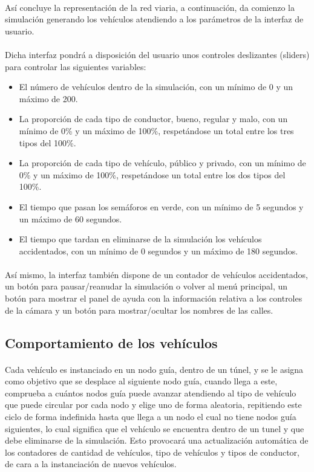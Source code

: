 	\paragraph{}
	Así concluye la representación de la red viaria, a continuación, da comienzo la simulación generando los vehículos atendiendo a los parámetros de la interfaz de usuario.
	
	\paragraph{}
	Dicha interfaz pondrá a disposición del usuario unos controles deslizantes (sliders) para controlar las siguientes variables:
	
	\begin{itemize}
	\item El número de vehículos dentro de la simulación, con un mínimo de 0 y un máximo de 200.
	\item La proporción de cada tipo de conductor, bueno, regular y malo, con un mínimo de 0\% y un máximo de 100\%, respetándose un total entre los tres tipos del 100\%.
	\item La proporción de cada tipo de vehículo, público y privado, con un mínimo de 0\% y un máximo de 100\%, respetándose un total entre los dos tipos del 100\%.
	\item El tiempo que pasan los semáforos en verde, con un mínimo de 5 segundos y un máximo de 60 segundos.
	\item El tiempo que tardan en eliminarse de la simulación los vehículos accidentados, con un mínimo de 0 segundos y un máximo de 180 segundos.
	\end{itemize}
	
	\paragraph{}
	Así mismo, la interfaz también dispone de un contador de vehículos accidentados, un botón para pausar/reanudar la simulación o volver al menú principal, un botón para mostrar el panel de ayuda con la información relativa a los controles de la cámara y un botón para mostrar/ocultar los nombres de las calles.
	
	\subsection{Comportamiento de los vehículos}
	\paragraph{}
	Cada vehículo es instanciado en un nodo guía, dentro de un túnel, y se le asigna como objetivo que se desplace al siguiente nodo guía, cuando llega a este, comprueba a cuántos nodos guía puede avanzar atendiendo al tipo de vehículo que puede circular por cada nodo y elige uno de forma aleatoria, repitiendo este ciclo de forma indefinida hasta que llega a un nodo el cual no tiene nodos guía siguientes, lo cual significa que el vehículo se encuentra dentro de un tunel y que debe eliminarse de la simulación. Esto provocará una actualización automática de los contadores de cantidad de vehículos, tipo de vehículos y tipos de conductor, de cara a la instanciación de nuevos vehículos.
	
